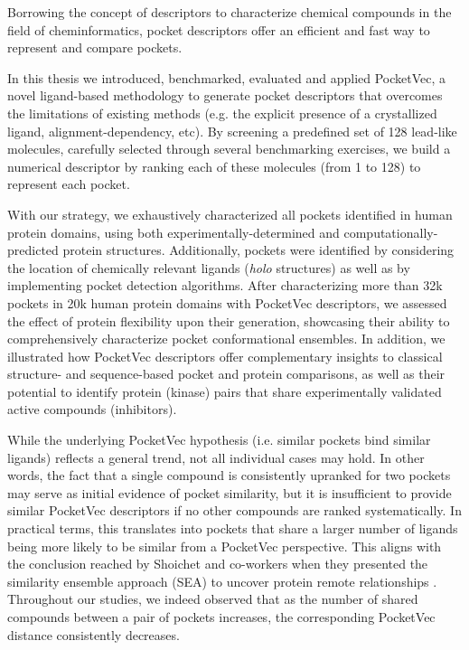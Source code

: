 Borrowing the concept of descriptors to characterize chemical compounds in the field of cheminformatics, pocket descriptors offer an efficient and fast way to represent and compare pockets. 

In this thesis we introduced, benchmarked, evaluated and applied PocketVec, a novel ligand-based methodology to generate pocket descriptors that overcomes the limitations of existing methods (e.g. the explicit presence of a crystallized ligand, alignment-dependency, etc). By screening a predefined set of 128 lead-like molecules, carefully selected through several benchmarking exercises, we build a numerical descriptor by ranking each of these molecules (from 1 to 128) to represent each pocket.

With our strategy, we exhaustively characterized all pockets identified in human protein domains, using both experimentally-determined and computationally-predicted protein structures. Additionally, pockets were identified by considering the location of chemically relevant ligands (\textit{holo} structures) as well as by implementing pocket detection algorithms. After characterizing more than 32k pockets in 20k human protein domains with PocketVec descriptors, we assessed the effect of protein flexibility upon their generation, showcasing their ability to comprehensively characterize pocket conformational ensembles. In addition, we illustrated how PocketVec descriptors offer complementary insights to classical structure- and sequence-based pocket and protein comparisons, as well as their potential to identify protein (kinase) pairs that share experimentally validated active compounds (inhibitors).

While the underlying PocketVec hypothesis (i.e. similar pockets bind similar ligands) reflects a general trend, not all individual cases may hold. In other words, the fact that a single compound is consistently upranked for two pockets may serve as initial evidence of pocket similarity, but it is insufficient to provide similar PocketVec descriptors if no other compounds are ranked systematically. In practical terms, this translates into pockets that share a larger number of ligands being more likely to be similar from a PocketVec perspective. This aligns with the conclusion reached by Shoichet and co-workers when they presented the similarity ensemble approach (SEA) to uncover protein remote relationships \cite{keiser_relating_2007}. Throughout our studies, we indeed observed that as the number of shared compounds between a pair of pockets increases, the corresponding PocketVec distance consistently decreases. 

